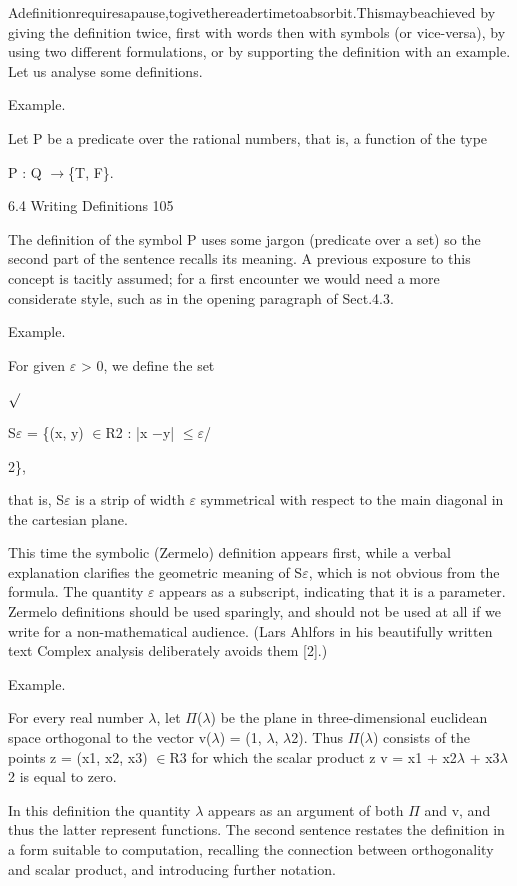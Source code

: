 \documentclass[11pt]{article}
\theoremstyle{plain}
\theoremstyle{definition}
\begin{document}
Adefinitionrequiresapause,togivethereadertimetoabsorbit.Thismaybeachieved by giving the definition twice, first with words then with symbols (or vice-versa), by using two different formulations, or by supporting the definition with an example. Let us analyse some definitions.

Example.

Let P be a predicate over the rational numbers, that is, a function of the type

P : Q $\to$\{T, F\}.

6.4 Writing Definitions 105

The definition of the symbol P uses some jargon (predicate over a set) so the second part of the sentence recalls its meaning. A previous exposure to this concept is tacitly assumed; for a first encounter we would need a more considerate style, such as in the opening paragraph of Sect.4.3.

Example.

For given $\varepsilon$ > 0, we define the set

$\surd$

S$\varepsilon$ = \{(x, y) $\in$R2 : |x $-$y| $\leq$$\varepsilon$/

2\},

that is, S$\varepsilon$ is a strip of width $\varepsilon$ symmetrical with respect to the main diagonal in the cartesian plane.

This time the symbolic (Zermelo) definition appears first, while a verbal explanation clarifies the geometric meaning of S$\varepsilon$, which is not obvious from the formula. The quantity $\varepsilon$ appears as a subscript, indicating that it is a parameter. Zermelo definitions should be used sparingly, and should not be used at all if we write for a non-mathematical audience. (Lars Ahlfors in his beautifully written text Complex analysis deliberately avoids them [2].)

Example.

For every real number $\lambda$, let $\Pi$($\lambda$) be the plane in three-dimensional euclidean space orthogonal to the vector v($\lambda$) = (1, $\lambda$, $\lambda$2). Thus $\Pi$($\lambda$) consists of the points z = (x1, x2, x3) $\in$R3 for which the scalar product z \textperiodcentered{} v = x1 + x2$\lambda$ + x3$\lambda$2 is equal to zero.

In this definition the quantity $\lambda$ appears as an argument of both $\Pi$ and v, and thus the latter represent functions. The second sentence restates the definition in a form suitable to computation, recalling the connection between orthogonality and scalar product, and introducing further notation.
\end{document}
